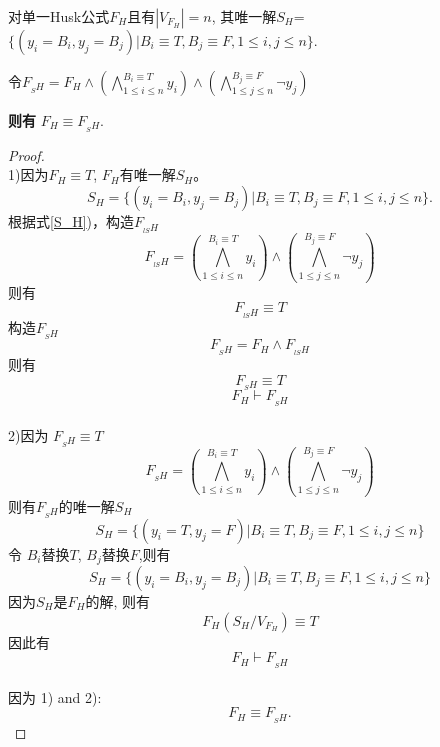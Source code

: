 \begin{lemma}\label{SHE}

对单一Husk公式${F_H}$且有$|V_{F_H}|= n$,
其唯一解$S_H$=$\{(y_i=B_i,y_j=B_j)|B_i\equiv T, B_j\equiv F, 1\leqslant i, j\leqslant n \}$.

令$F_{_SH}=F_H\wedge (\bigwedge_{1\leqslant i\leqslant n}^{B_i\equiv T}y_i)\wedge(\bigwedge_{1\leqslant j\leqslant n}^{B_j\equiv F}\neg y_j)$

\textbf{则有} $F_H \equiv F_{_SH}$.
\end{lemma}
\begin{proof}~\\
1)因为$F_H\equiv T$, $F_H$有唯一解$S_H$。
 \begin{equation}\label{S_H}
 S_H=\{(y_i=B_i,y_j=B_j)|B_i\equiv T, B_j\equiv F, 1\leqslant i, j\leqslant n \}.
\end{equation}
根据式\ref{S_H})，构造$F_{_{lS}H}$
\begin{equation}
 F_{_{lS}H}=(\bigwedge_{1\leqslant i\leqslant n}^{B_i\equiv T}y_i)\wedge(\bigwedge_{1\leqslant j\leqslant n}^{B_j\equiv F}\neg y_j)
\end{equation}
则有
\begin{equation}
 F_{_{lS}H} \equiv T
\end{equation}
构造$F_{_SH}$
\begin{equation}
 F_{_SH}=F_H\wedge F_{_{lS}H}
\end{equation}
则有
\begin{equation}
 F_{_SH} \equiv T
\end{equation}
\begin{equation}
 F_H \vdash F_{_SH}
\end{equation}\\
2)因为 $F_{_SH}\equiv T$
\begin{equation}
F_{_SH}=(\bigwedge_{1\leqslant i\leqslant n }^{B_i\equiv T}y_i)\wedge(\bigwedge_{1\leqslant j\leqslant n}^{B_j\equiv F}\neg y_j)
\end{equation}
则有$F_{_SH}$的唯一解$S_H$
\begin{equation}
S_H=\{(y_i=T,y_j=F)|B_i\equiv T, B_j\equiv F, 1\leqslant i, j\leqslant n \}
\end{equation}
令 $B_i$替换$T$, $B_j$替换$F$,则有
 \begin{equation}
S_H=\{(y_i=B_i,y_j=B_j)|B_i\equiv T, B_j\equiv F, 1\leqslant i, j\leqslant n \}
 \end{equation}
因为$S_H$是$F_H$的解, 则有
\begin{equation}
F_H(S_H/V_{F_H})\equiv T
\end{equation}
 因此有
 \begin{equation}
  F_H \vdash F_{_SH}
 \end{equation}
 \\
因为 1) and 2):
\begin{equation}
 F_H \equiv F_{_SH}.
\end{equation}
\end{proof}


